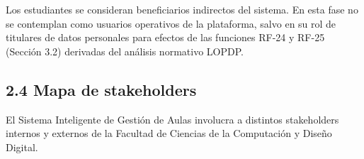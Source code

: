 Los estudiantes se consideran beneficiarios indirectos del sistema. En esta fase no se contemplan como usuarios operativos de la plataforma, salvo en su rol de titulares de datos personales para efectos de las funciones RF-24 y RF-25 (Sección 3.2) derivadas del análisis normativo LOPDP.


\subsection*{2.4 Mapa de stakeholders}


El Sistema Inteligente de Gestión de Aulas involucra a distintos stakeholders internos y externos de la Facultad de Ciencias de la Computación y Diseño Digital.


